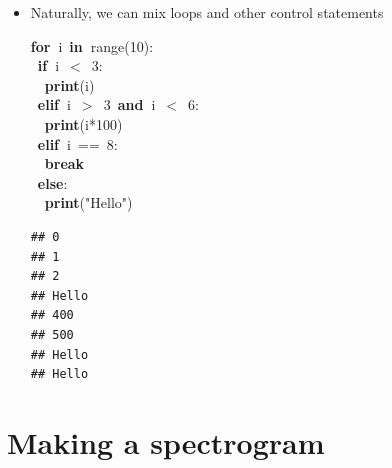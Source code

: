\documentclass{beamer}\usepackage[]{graphicx}\usepackage[]{color}
\makeatletter
\newcommand{\hlnum}[1]{\textcolor[rgb]{0.686,0.059,0.569}{#1}}%
\newcommand{\hlstr}[1]{\textcolor[rgb]{0.192,0.494,0.8}{#1}}%
\newcommand{\hlopt}[1]{\textcolor[rgb]{0,0,0}{#1}}%
\newcommand{\hlstd}[1]{\textcolor[rgb]{0.345,0.345,0.345}{#1}}%
\newcommand{\hlkwa}[1]{\textcolor[rgb]{0.161,0.373,0.58}{\textbf{#1}}}%
\newcommand{\hlkwb}[1]{\textcolor[rgb]{0.69,0.353,0.396}{#1}}%
\newenvironment{kframe}{%
 \def\at@end@of@kframe{}%
 \ifinner\ifhmode%
  \def\at@end@of@kframe{\end{minipage}}%
  \begin{minipage}{\columnwidth}%
 \fi\fi%
 \def\FrameCommand##1{\hskip\@totalleftmargin \hskip-\fboxsep
 \colorbox{shadecolor}{##1}\hskip-\fboxsep
     \hskip-\linewidth \hskip-\@totalleftmargin \hskip\columnwidth}%
 \MakeFramed {\advance\hsize-\width
   \@totalleftmargin\z@ \linewidth\hsize
   \@setminipage}}%
 {\par\unskip\endMakeFramed%
 \at@end@of@kframe}
\newenvironment{knitrout}{}{} %
\makeatother
\begin{document}
\begin{frame}[fragile]
\begin{itemize}
	\item Naturally, we can mix loops and other control statements 

\begin{knitrout}\tiny
{}\color{fgcolor}\begin{kframe}
\noindent
\ttfamily
\hlstd{}\hlkwa{for\ }\hlstd{i\ }\hlkwa{in\ }\hlstd{}\hlkwb{range}\hlstd{}\hlopt{(}\hlstd{}\hlnum{10}\hlstd{}\hlopt{):}\hspace*{\fill}\\
\hlstd{\ }\hlkwa{if\ }\hlstd{i\ }\hlopt{$<$\ }\hlstd{}\hlnum{3}\hlstd{}\hlopt{:}\hspace*{\fill}\\
\hlstd{}\hlstd{\ \ }\hlstd{}\hlkwa{print}\hlstd{}\hlopt{(}\hlstd{i}\hlopt{)}\hspace*{\fill}\\
\hlstd{\ }\hlkwa{elif\ }\hlstd{i\ }\hlopt{$>$\ }\hlstd{}\hlnum{3\ }\hlstd{}\hlkwa{and\ }\hlstd{i\ }\hlopt{$<$\ }\hlstd{}\hlnum{6}\hlstd{}\hlopt{:}\hspace*{\fill}\\
\hlstd{}\hlstd{\ \ }\hlstd{}\hlkwa{print}\hlstd{}\hlopt{(}\hlstd{i}\hlopt{{*}}\hlstd{}\hlnum{100}\hlstd{}\hlopt{)}\hspace*{\fill}\\
\hlstd{\ }\hlkwa{elif\ }\hlstd{i\ }\hlopt{==\ }\hlstd{}\hlnum{8}\hlstd{}\hlopt{:}\hspace*{\fill}\\
\hlstd{}\hlstd{\ \ }\hlstd{}\hlkwa{break}\hspace*{\fill}\\
\hlstd{\ }\hlkwa{else}\hlstd{}\hlopt{:}\hspace*{\fill}\\
\hlstd{}\hlstd{\ \ }\hlstd{}\hlkwa{print}\hlstd{}\hlopt{(}\hlstd{}\hlstr{"Hello"}\hlstd{}\hlopt{)}\hlstd{}\hspace*{\fill}
\mbox{}
\normalfont

\begin{verbatim}
## 0
## 1
## 2
## Hello
## 400
## 500
## Hello
## Hello
\end{verbatim}
\end{kframe}
\end{knitrout}
\end{itemize}
\end{frame}

\section{Making a spectrogram}
\end{document}
